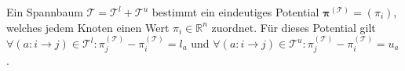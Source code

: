 \documentclass[a4paper, 11pt, twocolumn]{scrartcl}
\newcommand{\R}{\ensuremath{\mathbb{R}}}
\renewcommand{\vec}[1]{\boldsymbol{\mathbf{#1}}}
\begin{document}
		Ein Spannbaum \( \mathcal{T} = \mathcal{T}^l + \mathcal{T}^u \) bestimmt ein eindeutiges Potential \( \vec{\pi}^{(\mathcal{T})} = (\pi_i) \), welches jedem Knoten einen Wert \( \pi_i \in \R^n \) zuordnet. Für dieses Potential gilt \( \forall (a : i \to j) \in \mathcal{T}^l : \pi^{(\mathcal{T})}_j - \pi^{(\mathcal{T})}_i = l_a \) und \( \forall (a : i \to j) \in \mathcal{T}^u : \pi^{(\mathcal{T})}_j - \pi^{(\mathcal{T})}_i = u_a \).
		


	
\end{document}
